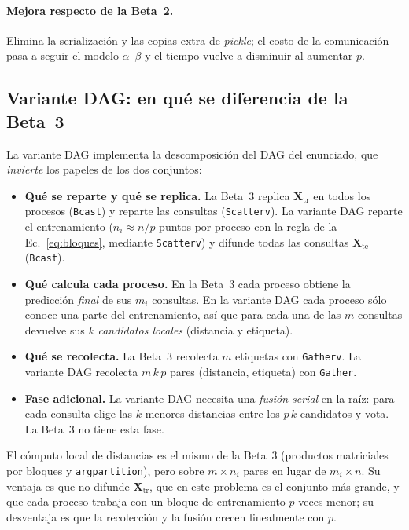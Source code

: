 \documentclass[11pt,a4paper]{article}
\newcommand{\ntr}{n}   %
\newcommand{\mte}{m}   %
\newcommand{\Xtr}{\mathbf{X}_{\text{tr}}}
\newcommand{\Xte}{\mathbf{X}_{\text{te}}}
\begin{document}
\paragraph{Mejora respecto de la Beta~2.} Elimina la serialización y las copias extra de \emph{pickle};
el costo de la comunicación pasa a seguir el modelo $\alpha$--$\beta$ y el tiempo vuelve a disminuir
al aumentar $p$.

\subsection{Variante DAG: en qué se diferencia de la Beta~3}
La variante DAG implementa la descomposición del DAG del enunciado, que \emph{invierte} los papeles
de los dos conjuntos:
\begin{itemize}
  \item \textbf{Qué se reparte y qué se replica.} La Beta~3 replica $\Xtr$ en todos los procesos
        (\texttt{Bcast}) y reparte las consultas (\texttt{Scatterv}). La variante DAG reparte el
        entrenamiento ($n_i\approx\ntr/p$ puntos por proceso con la regla de la
        Ec.~\eqref{eq:bloques}, mediante \texttt{Scatterv}) y difunde todas las consultas $\Xte$
        (\texttt{Bcast}).
  \item \textbf{Qué calcula cada proceso.} En la Beta~3 cada proceso obtiene la predicción
        \emph{final} de sus $m_i$ consultas. En la variante DAG cada proceso sólo conoce una parte del
        entrenamiento, así que para cada una de las $\mte$ consultas devuelve sus $k$
        \emph{candidatos locales} (distancia y etiqueta).
  \item \textbf{Qué se recolecta.} La Beta~3 recolecta $\mte$ etiquetas con \texttt{Gatherv}. La
        variante DAG recolecta $\mte\,k\,p$ pares (distancia, etiqueta) con \texttt{Gather}.
  \item \textbf{Fase adicional.} La variante DAG necesita una \emph{fusión serial} en la raíz: para cada
        consulta elige las $k$ menores distancias entre los $p\,k$ candidatos y vota. La Beta~3 no
        tiene esta fase.
\end{itemize}
El cómputo local de distancias es el mismo de la Beta~3 (productos matriciales por bloques y
\texttt{argpartition}), pero sobre $\mte\times n_i$ pares en lugar de $m_i\times\ntr$. Su ventaja es
que no difunde $\Xtr$, que en este problema es el conjunto más grande, y que cada proceso trabaja
con un bloque de entrenamiento $p$ veces menor; su desventaja es que la recolección y la fusión
crecen linealmente con $p$.
\end{document}
